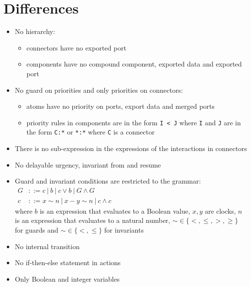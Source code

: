 \documentclass[a4paper]{article}
\begin{document}
\section*{Differences}
\begin{itemize}
  \item No hierarchy:
        \begin{itemize}
          \item connectors have no exported port
          \item components have no compound component, exported data and exported port
        \end{itemize}
  \item No guard on priorities and only priorities on connectors:
        \begin{itemize}
          \item atoms have no priority on ports, export data and merged ports
          \item priority rules in components are in the form \texttt{I < J} where \texttt{I} and \texttt{J} are in the
                form \texttt{C:*} or \texttt{*:*} where \texttt{C} is a connector
        \end{itemize}
  \item There is no sub-expression in the expressions of the interactions in connectors
  \item No delayable urgency, invariant from and resume
  \item Guard and invariant conditions are restricted to the grammar: \\
        $\begin{aligned}
            G & ::= c \:\vert\: b \:\vert\: c \vee b \:\vert\: G \wedge G \\
            c & ::= x \sim n \:\vert\: x - y \sim n \:\vert\: c\wedge c
          \end{aligned}$ \\
        where $b$ is an expression that evaluates to a Boolean value, $x,y$ are clocks, $n$ is an expression that
        evaluates to a natural number, $\sim \in \{<, \leq, >, \geq \}$ for guards and $\sim \in \{<, \leq \}$ for
        invariants
  \item No internal transition
  \item No if-then-else statement in actions
  \item Only Boolean and integer variables
\end{itemize}
\end{document}
